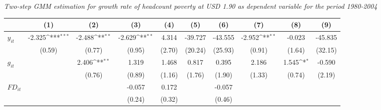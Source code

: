 \documentclass[12pt, a4paper]{article}
\begin{document}
\begin{table}
\begin{threeparttable}
\begin{tablenotes}
		\end{tablenotes}
	\end{threeparttable}
	\caption[Two-Step System-GMM Estimation Results for Headcount Poverty at USD 1.90 for 1980-2004]{\textit{Two-step GMM estimation for growth rate of headcount poverty at USD 1.90 as dependent variable for the period 1980-2004}}
	\label{2GMM1902005}
\end{table}

	\begin{table}
	\centering
	\scriptsize
	\setlength\tabcolsep{1pt}	
	\begin{threeparttable}
		{
			\def\sym#1{\ifmmode^{#1}\else\(^{#1}\)\fi}
			\begin{tabular}{l*{9}{c}}
				\hline\hline
				&\multicolumn{1}{c}{(1)}&\multicolumn{1}{c}{(2)}&\multicolumn{1}{c}{(3)}&\multicolumn{1}{c}{(4)}&\multicolumn{1}{c}{(5)}&\multicolumn{1}{c}{(6)}&\multicolumn{1}{c}{(7)}&\multicolumn{1}{c}{(8)}&\multicolumn{1}{c}{(9)}\\
				\hline
				$y_{it}$               &      -2.325\sym{***}&      -2.488\sym{**} &      -2.629\sym{**} &       4.314         &     -39.727         &     -43.555         &      -2.952\sym{**} &      -0.023         &     -45.835         \\
				&      (0.59)         &      (0.77)         &      (0.95)         &      (2.70)         &     (20.24)         &     (25.93)         &      (0.91)         &      (1.64)         &     (32.15)         \\
				$g_{it}$             &                     &       2.406\sym{**} &       1.319         &       1.468         &       0.817         &       0.395         &       2.186         &       1.545\sym{*}  &      -0.590         \\
				&                     &      (0.76)         &      (0.89)         &      (1.16)         &      (1.76)         &      (1.90)         &      (1.33)         &      (0.74)         &      (2.19)         \\
				$FD_{it}$               &                     &                     &      -0.057         &       0.172         &                     &      -0.057         &                     &                     &                     \\
				&                     &                     &      (0.24)         &      (0.32)         &                     &      (0.46)         &                     &                     &                     \\

\end{tabular}}
\end{threeparttable}
\end{table}
\end{document}

